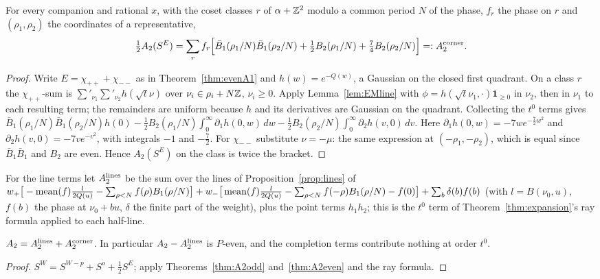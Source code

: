 \begin{theorem}\label{thm:A2even}
For every companion and rational $x$, with the coset classes $r$ of $\alpha+\mathbb{Z}^2$ modulo a common period $N$ of the phase, $f_r$ the phase on $r$ and $(\rho_1,\rho_2)$ the
coordinates of a representative,
\[ \tfrac12A_2(S^E)=\sum_r f_r\Big[\bar B_1(\rho_1/N)\bar B_1(\rho_2/N)+\tfrac12B_2(\rho_1/N)+\tfrac74B_2(\rho_2/N)\Big]=:A_2^{\rm corner}. \]
\end{theorem}
\begin{proof}
Write $E=\chi_{++}+\chi_{--}$ as in Theorem~\ref{thm:evenA1} and $h(w)=e^{-Q(w)}$, a Gaussian on the closed first quadrant. On a class $r$ the $\chi_{++}$-sum is
$\sum'_{\nu_1}\sum'_{\nu_2}h(\sqrt t\nu)$ over $\nu_i\in\rho_i+N\mathbb{Z}$, $\nu_i\ge0$. Apply Lemma~\ref{lem:EMline} with $\phi=h(\sqrt t\nu_1,\cdot)\mathbf 1_{\ge0}$ in $\nu_2$, then in
$\nu_1$ to each resulting term; the remainders are uniform because $h$ and its derivatives are Gaussian on the quadrant. Collecting the $t^0$ terms gives
$\bar B_1(\rho_1/N)\bar B_1(\rho_2/N)h(0)-\frac12B_2(\rho_1/N)\int_0^\infty\partial_1h(0,w)\,dw-\frac12B_2(\rho_2/N)\int_0^\infty\partial_2h(v,0)\,dv$. Here
$\partial_1h(0,w)=-7we^{-\frac72w^2}$ and $\partial_2h(v,0)=-7ve^{-v^2}$, with integrals $-1$ and $-\frac72$. For $\chi_{--}$ substitute $\nu=-\mu$: the same expression at
$(-\rho_1,-\rho_2)$, which is equal since $\bar B_1\bar B_1$ and $B_2$ are even. Hence $A_2(S^E)$ on the class is twice the bracket.
\end{proof}

For the line terms let $A_2^{\rm lines}$ be the sum over the lines of Proposition~\ref{prop:lines} of
$w_+\big[-\operatorname{mean}(f)\frac{l}{2Q(u)}-\sum_{\rho<N}f(\rho)B_1(\rho/N)\big]+w_-\big[\operatorname{mean}(f)\frac{l}{2Q(u)}-\sum_{\rho<N}f(-\rho)B_1(\rho/N)-f(0)\big]+\sum_b\delta(b)f(b)$
(with $l=B(\nu_0,u)$, $f(b)$ the phase at $\nu_0+bu$, $\delta$ the finite part of the weight), plus the point terms $h_1h_2$; this is the $t^0$ term of
Theorem~\ref{thm:expansion}'s ray formula applied to each half-line.
\begin{theorem}\label{thm:A2exact}
$A_2=A_2^{\rm lines}+A_2^{\rm corner}$. In particular $A_2-A_2^{\rm lines}$ is $P$-even, and the completion terms contribute nothing at order $t^0$.
\end{theorem}
\begin{proof}
$S^W=S^{W-p}+S^o+\frac12S^E$; apply Theorems~\ref{thm:A2odd} and~\ref{thm:A2even} and the ray formula.
\end{proof}

